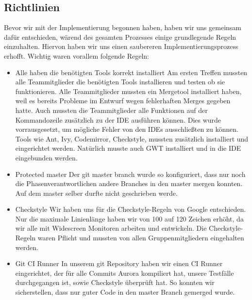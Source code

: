 \documentclass[parskip=full,11pt,twoside]{scrartcl}
\begin{document}
\subsection{Richtlinien}
Bevor wir mit der Implementierung begonnen haben, haben wir uns gemeinsam dafür entschieden,
wärend des gesamten Prozesses einige grundlegende Regeln einzuhalten.
Hiervon haben wir uns einen saubereren Implementierungsprozess erhofft.
Wichtig waren vorallem folgende Regeln:
\begin{itemize}
	\item Alle haben die benötigten Tools korrekt installiert
	\newline
	Am ersten Treffen mussten alle Teammitglieder die benötigten Tools installieren und testen ob sie funktionieren.
	Alle Teammitglieder mussten ein Mergetool installiert haben, weil es bereits Probleme im Entwurf wegen fehlerhaften Merges gegeben hatte.
	Auch mussten die Teammitglieder alle Funktionen auf der Kommandozeile zusätzlich 	zu der IDE ausführen können. Dies wurde vorrausgesetzt, um mögliche Fehler von den IDEs ausschließten zu können.
	Tools wie Ant, Ivy, Codemirror, Checkstyle, mussten zusätzlich installiert und eingerichtet werden.
	Natürlich musste auch GWT installiert und in die IDE eingebunden werden.

    \item Protected master
        \newline
        Der git master branch wurde so konfiguriert, dass nur noch die Phasenverantwortlichen andere Branches in den master mergen konnten.
        Auf dem master selber durfte nicht geschrieben werde.
    \item Checkstyle
    \newline
    Wir haben uns für die Checkstyle-Regeln von Google entschieden. Nur die maximale Linienlänge haben wir von 100 auf 120 Zeichen erhöht, da wir alle mit Widescreen Monitoren arbeiten und entwickeln. Die Checkstyle-Regeln waren Pflicht und mussten von allen Gruppenmitgliedern eingehalten werden.
    \item Git CI Runner
        \newline
        In unserem git Repository haben wir einen CI Runner eingerichtet, der für alle Commits Aurora kompiliert hat, unsere Testfälle durchgegangen ist, sowie Checkstyle überprüft hat.
        So konnten wir sicherstellen, dass nur guter Code in den master Branch gemerged wurde.


\end{itemize}
\end{document}

